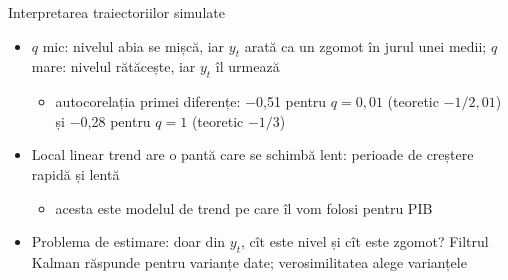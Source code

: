 \begin{frame}{Interpretarea traiectoriilor simulate}
\itemsize{\small}
\begin{itemize}
    \item $q$ mic: nivelul abia se mișcă, iar $y_t$ arată ca un zgomot în jurul unei medii; $q$ mare: nivelul rătăcește, iar $y_t$ îl urmează
    \begin{itemize}
        \item autocorelația primei diferențe: \ensuremath{-}0{,}51 pentru $q = 0{,}01$ (teoretic $-1/2{,}01$) și \ensuremath{-}0{,}28 pentru $q = 1$ (teoretic $-1/3$)
    \end{itemize}
    \item Local linear trend are o pantă care se schimbă lent: perioade de creștere rapidă și lentă
    \begin{itemize}
        \item acesta este modelul de trend pe care îl vom folosi pentru PIB
    \end{itemize}
    \item Problema de estimare: doar din $y_t$, cît este nivel și cît este zgomot? Filtrul Kalman răspunde pentru varianțe date; verosimilitatea alege varianțele
\end{itemize}
\end{frame}

